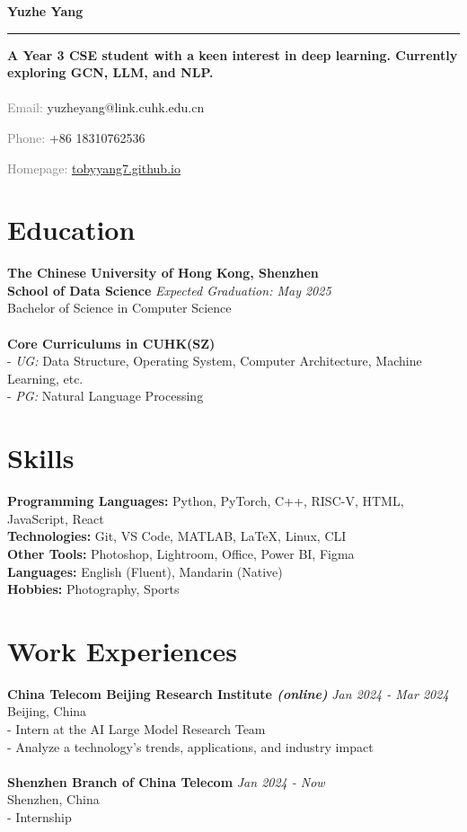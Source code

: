 \documentclass[a4paper,10pt]{article}
\newcommand{\name}[1]{\noindent\textbf{\LARGE #1}\vspace{0.5em}\hrule\vspace{1em}}
\newcommand{\contact}[2]{\noindent\textcolor{gray}{#1:} #2\par}
\begin{document}
\name{Yuzhe Yang}

\textbf{A Year 3 CSE student with a keen interest in deep learning. Currently exploring GCN, LLM, and NLP.\\}
\\
\contact{Email}{yuzheyang@link.cuhk.edu.cn}
\contact{Phone}{+86 18310762536}
\contact{Homepage}{\href{https://tobyyang7.github.io/}{tobyyang7.github.io}}

\section*{Education}
\textbf{The Chinese University of Hong Kong, Shenzhen\\ \textbf{School of Data Science}} \hfill \textit{Expected Graduation: May 2025}\\
Bachelor of Science in Computer Science\\
\\
\textbf{Core Curriculums in CUHK(SZ)}
\\- \textit{UG:} Data Structure, Operating System, Computer Architecture, Machine Learning, etc.
\\- \textit{PG:} Natural Language Processing


\section*{Skills}
\textbf{Programming Languages:} Python, PyTorch, C++, RISC-V, HTML, JavaScript, React\\
\textbf{Technologies:} Git, VS Code, MATLAB, \LaTeX, Linux, CLI\\
\textbf{Other Tools:} Photoshop, Lightroom, Office, Power BI, Figma\\
\textbf{Languages:} English (Fluent), Mandarin (Native)\\
\textbf{Hobbies:} Photography, Sports

\section*{Work Experiences}
\textbf{China Telecom Beijing Research Institute \textit{(online)}} \hfill \textit{Jan 2024 - Mar 2024}\\
Beijing, China\\
- Intern at the AI Large Model Research Team\\
- Analyze a technology's trends, applications, and industry impact\\
\\
\textbf{Shenzhen Branch of China Telecom} \hfill \textit{Jan 2024 - Now}\\
Shenzhen, China\\
- Internship\\
\end{document}
